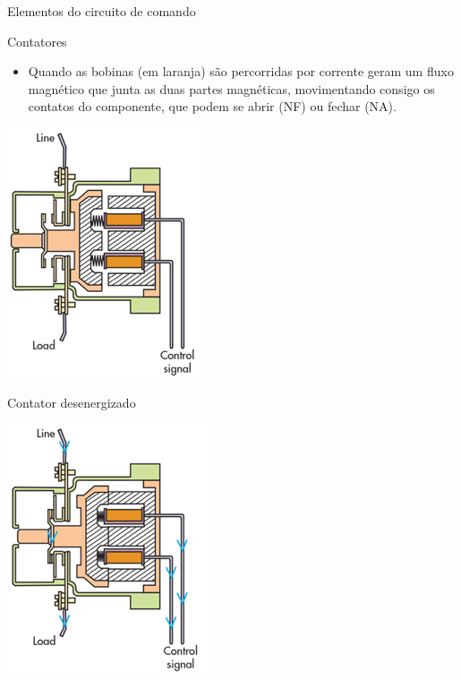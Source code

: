 \begin{frame}{Elementos do circuito de comando}
\begin{block}{Contatores}
	\begin{itemize}
		\item Quando as bobinas (em laranja) são percorridas por corrente geram um fluxo magnético que junta as duas partes magnéticas, movimentando consigo os contatos do componente, que podem se abrir (NF) ou fechar (NA).
	\end{itemize}
\end{block}

\begin{minipage}{0.45\linewidth}
	\centering
	\includegraphics[width=0.6\linewidth]{Figuras/Ch06/fig8.jpg}
	
	Contator desenergizado
\end{minipage}
\hfill
\begin{minipage}{0.45\linewidth}
	\centering
	\includegraphics[width=0.6\linewidth]{Figuras/Ch06/fig9.jpg}
	

\end{minipage}
\end{frame}
